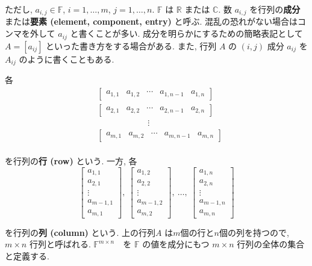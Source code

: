 \documentclass[a4paper]{scrbook}
\theoremstyle{definition}
\begin{document}
ただし, \(a_{i,j}\in\mathbb{F}\), \(i=1,\dots,m\), \(j=1,\dots,n\).
\(\mathbb{F}\) は \(\mathbb{R}\) または \(\mathbb{C}\). 数 \(a_{i,j}\)
を行列の\textbf{成分}または\textbf{要素 (element, component, entry)}
と呼ぶ. 混乱の恐れがない場合はコンマを外して \(a_{ij}\)
と書くことが多い. 成分を明らかにするための簡略表記として \(A=[a_{ij}]\)
といった書き方をする場合がある. また, 行列 \(A\) の \((i,j)\) 成分
\(a_{ij}\) を\(A_{ij}\) のように書くこともある.

各\\
\[
\begin{aligned}
  &\begin{bmatrix}a_{1,1} & a_{1,2} & \cdots & a_{1,n-1} & a_{1,n}\end{bmatrix}\\
  &\begin{bmatrix}a_{2,1} & a_{2,2} & \cdots & a_{2,n-1} & a_{2,n}\end{bmatrix}\\
  &\hspace{6em}\vdots\\
  &\begin{bmatrix}a_{m,1} & a_{m,2} & \cdots & a_{m,n-1} & a_{m,n}\end{bmatrix}
\end{aligned}
\]\\
を行列の\textbf{行 (row)} という. 一方, 各 \[
\begin{bmatrix}a_{1,1}\\
a_{2,1}\\
\vdots\\
a_{m-1,1}\\
a_{m,1}
\end{bmatrix},\ \begin{bmatrix}a_{1,2}\\
a_{2,2}\\
\vdots\\
a_{m-1,2}\\
a_{m,2}
\end{bmatrix},\ \dots,\ \begin{bmatrix}a_{1,n}\\
a_{2,n}\\
\vdots\\
a_{m-1,n}\\
a_{m,n}
\end{bmatrix}
\]

を行列の\textbf{列 (column)} という. 上の行列\(A\)
は\(m\)個の行と\(n\)個の列を持つので, \(m\times n\) 行列と呼ばれる.
\(\mathbb{F}^{m\times n}\)　を \(\mathbb{F}\) の値を成分にもつ
\(m\times n\) 行列の全体の集合と定義する.
\end{document}
